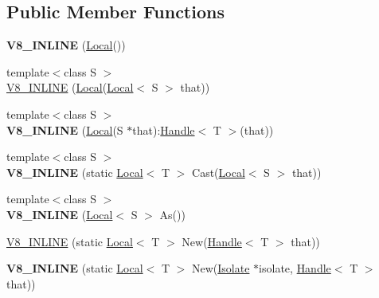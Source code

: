 \subsection*{Public Member Functions}
\begin{DoxyCompactItemize}
\item 
\hypertarget{classv8_1_1_local_acd71c6a66f5114d76b3a3c02a16547c1}{}{\bfseries V8\+\_\+\+I\+N\+L\+I\+N\+E} (\hyperlink{classv8_1_1_local}{Local}())\label{classv8_1_1_local_acd71c6a66f5114d76b3a3c02a16547c1}

\item 
{\footnotesize template$<$class S $>$ }\\\hyperlink{classv8_1_1_local_a5f4598866402a6a896e2bf5863a3ab4c}{V8\+\_\+\+I\+N\+L\+I\+N\+E} (\hyperlink{classv8_1_1_local}{Local}(\hyperlink{classv8_1_1_local}{Local}$<$ S $>$ that))
\item 
\hypertarget{classv8_1_1_local_a33fde5f107f7820eaae0e4368c6686f1}{}{\footnotesize template$<$class S $>$ }\\{\bfseries V8\+\_\+\+I\+N\+L\+I\+N\+E} (\hyperlink{classv8_1_1_local}{Local}(S $\ast$that)\+:\hyperlink{classv8_1_1_handle}{Handle}$<$ T $>$(that))\label{classv8_1_1_local_a33fde5f107f7820eaae0e4368c6686f1}

\item 
\hypertarget{classv8_1_1_local_a3ddee57e5675b4b1404f26427d23dcd0}{}{\footnotesize template$<$class S $>$ }\\{\bfseries V8\+\_\+\+I\+N\+L\+I\+N\+E} (static \hyperlink{classv8_1_1_local}{Local}$<$ T $>$ Cast(\hyperlink{classv8_1_1_local}{Local}$<$ S $>$ that))\label{classv8_1_1_local_a3ddee57e5675b4b1404f26427d23dcd0}

\item 
\hypertarget{classv8_1_1_local_a08ed8f55acad5cd41566be97cae027d9}{}{\footnotesize template$<$class S $>$ }\\{\bfseries V8\+\_\+\+I\+N\+L\+I\+N\+E} (\hyperlink{classv8_1_1_local}{Local}$<$ S $>$ As())\label{classv8_1_1_local_a08ed8f55acad5cd41566be97cae027d9}

\item 
\hyperlink{classv8_1_1_local_a4bcce5962fa2f2b9131a110f79350e7c}{V8\+\_\+\+I\+N\+L\+I\+N\+E} (static \hyperlink{classv8_1_1_local}{Local}$<$ T $>$ New(\hyperlink{classv8_1_1_handle}{Handle}$<$ T $>$ that))
\item 
\hypertarget{classv8_1_1_local_a8b0ac03c4da07a94a9cb91620a0062d9}{}{\bfseries V8\+\_\+\+I\+N\+L\+I\+N\+E} (static \hyperlink{classv8_1_1_local}{Local}$<$ T $>$ New(\hyperlink{classv8_1_1_isolate}{Isolate} $\ast$isolate, \hyperlink{classv8_1_1_handle}{Handle}$<$ T $>$ that))\label{classv8_1_1_local_a8b0ac03c4da07a94a9cb91620a0062d9}

\end{DoxyCompactItemize}


